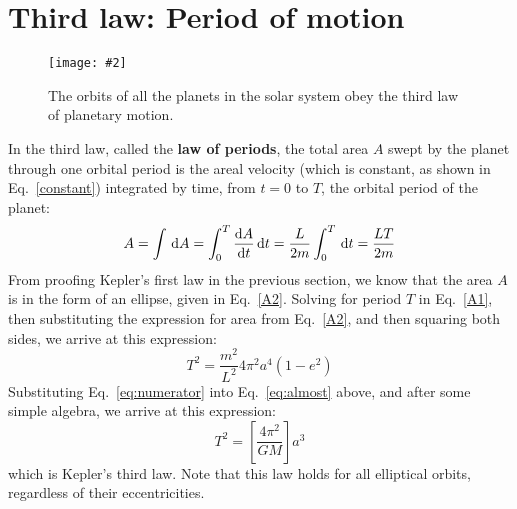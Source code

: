 \documentclass{../../../oss-handout}
\newcommand{\pic}[2]{\texttt{[image: \#2]}}
\begin{document}
\section{Third law: Period of motion}
\begin{figure}[!ht]
  \centering
  \pic{.55}{../kep8}
  \caption{The orbits of all the planets in the solar system obey the third
  law of planetary motion.}
  \label{3rdlaw}
\end{figure}
In the third law, called the \textbf{law of periods}, the total area $A$
swept by the planet through one orbital period is the areal velocity (which is
constant, as shown in Eq.\ \ref{constant}) integrated by time, from $t=0$ to
$T$, the orbital period of the planet:
\begin{equation}
  A=\int\dl A=\int_0^T\diff At\dl t=\frac{L}{2m}\int_0^T\dl t=\frac{LT}{2m}
  \label{A1}
\end{equation}
From proofing Kepler's first law in the previous section, we know that the
area $A$ is in the form of an ellipse, given in Eq.~\ref{A2}. Solving for
period $T$ in Eq.~\ref{A1}, then substituting the expression for area from
Eq.~\ref{A2}, and then squaring both sides, we arrive at this expression:
\begin{equation}
  T^2=\frac{m^2}{L^2}4\pi^2a^4(1-e^2)
  \label{eq:almost}
\end{equation}
Substituting Eq.~\ref{eq:numerator}
into Eq.\ \ref{eq:almost} above, and after some simple algebra, we arrive at
this expression:
\begin{equation}
  \boxed{T^2=\left[\frac{4\pi^2}{GM}\right] a^3}
\end{equation}
which is Kepler's third law. Note that this law holds for all elliptical
orbits, regardless of their eccentricities.
\end{document}
